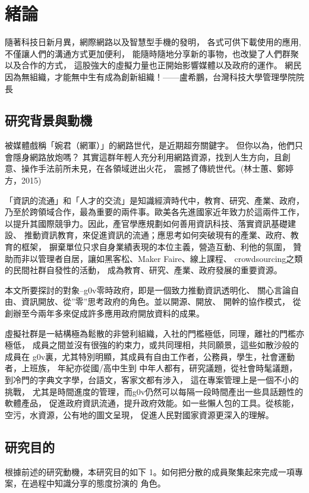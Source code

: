 \chapter{緒論}

隨著科技日新月異，網際網路以及智慧型手機的發明，
各式可供下載使用的應用, 不僅讓人們的溝通方式更加便利，
能隨時隨地分享新的事物，也改變了人們群聚以及合作的方式，
這股強大的虛擬力量也正開始影響媒體以及政府的運作。
網民因為無組織，才能無中生有成為創新組織！——盧希鵬，台灣科技大學管理學院院長






\section{研究背景與動機}

被媒體戲稱「婉君（網軍）」的網路世代，是近期超夯關鍵字。
但你以為，他們只會隱身網路放炮嗎？
其實這群年輕人充分利用網路資源，找到人生方向，且創意、操作手法前所未見，在各領域迸出火花，
震撼了傳統世代。(林士蕙、鄭婷方，2015)

「資訊的流通」和「人才的交流」是知識經濟時代中，教育、研究、產業、政府，
乃至於跨領域合作，最為重要的兩件事。歐美各先進國家近年致力於這兩件工作，
以提升其國際競爭力。因此，產官學應規劃如何善用資訊科技、落實資訊基礎建設、
推動資訊教育，來促進資訊的流通；應思考如何突破現有的產業、政府、教育的框架，
摒棄單位只求自身業績表現的本位主義，營造互動、利他的氛圍，
贊助而非以管理者自居，讓如黑客松、Maker Faire、線上課程、
crowdsourcing之類的民間社群自發性的活動，
成為教育、研究、產業、政府發展的重要資源。

本文所要探討的對象--g0v零時政府，即是一個致力推動資訊透明化、
關心言論自由、資訊開放、從”零”思考政府的角色。並以開源、開放、
開幹的協作模式， 從創辦至今兩年多來促成許多應用政府開放資料的成果。

虛擬社群是一結構極為鬆散的非營利組織，入社的門檻極低，同理，離社的門檻亦極低，
成員之間並沒有很強的約束力，或共同理相，共同願景，這些如散沙般的成員在
g0v裏，尤其特別明顯，其成員有自由工作者，公務員，學生，社會運動者，上班族，
年紀亦從國/高中生到
中年人都有，研究議題，從社會時髦議題，到冷門的字典文字學，台語文，客家文都有涉入，
這在專案管理上是一個不小的挑戰，
尤其是時間進度的管理，而g0v仍然可以每隔一段時間產出一些具話題性的軟體產品，
促進政府資訊流通，提升政府效能。如一些懶人包的工具。從核能，空污，水資源，公有地的圖文呈現，
促進人民對國家資源更深入的理解。



\section{研究目的}
根據前述的研究動機，本研究目的如下
1。如何把分散的成員聚集起來完成一項專案，在過程中知識分享的態度扮演的
   角色。

